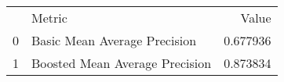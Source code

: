 \begin{tabular}{llr}
 & Metric & Value \\
0 & Basic Mean Average Precision & 0.677936 \\
1 & Boosted Mean Average Precision & 0.873834 \\
\end{tabular}
